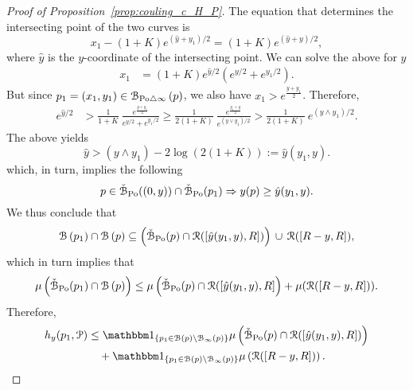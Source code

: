 \begin{proof}[Proof of Proposition~\ref{prop:couling_c_H_P}]
The equation that determines the intersecting point of the two curves is
\[
	x_1 - (1+K)e^{(\hat{y} + y_1)/2}= (1+K) e^{(\hat{y} + y)/2},
\]
where $\hat{y}$ is the $y$-coordinate of the intersecting point. 
We can solve the above for $\hat{y}$  
\begin{equation*} 
\begin{split}
x_1 &=(1+K) e^{\hat{y}/2} \left( e^{y/2} + e^{y_1/2} \right).
\end{split}
\end{equation*}
But since $p_1=(x_1,y_1)  \in {\mathcal B}_{{\mathrm{Po}} \bigtriangleup \infty}\left(p\right)$, we also have $x_1 > e^{\frac{y + y_1}{2}}$. Therefore, 
\begin{equation}\label{eq:bounds_fat_ball_points}
\begin{split}
 e^{\hat{y}/2}& > \frac{1}{1+K}~\frac{e^{\frac{y + y_1}{2}}}{ e^{y/2}+ e^{y_1/2}} \geq 
\frac{1}{2(1+K)}~\frac{e^{\frac{y_1 + y}{2}}}{ e^{(y \vee y_1) /2}} 
> \frac{1}{2(1 + K)} ~ e^{(y \wedge y_1)/2}. 
 \end{split}
\end{equation}
The above yields
\begin{equation} \label{eq:to_use_I}
\hat{y} > (y \wedge y_1) - 2\log(2(1+K)) := \hat{y}(y_1, y). 
\end{equation}
which, in turn, implies the following 
\begin{equation}\label{eq:intersex_approx}
	p \in \check{{\mathcal B}}_{{\mathrm{Po}}}((0,y))\cap \check{{\mathcal B}}_{{\mathrm{Po}}}(p_1) \Rightarrow y(p) \ge \hat{y}(y_1,y).
\end{equation}
We thus conclude that 
\[ 
	{\mathcal B}\left(p_1\right) \cap {\mathcal B}\left(p\right) \subseteq \left(\check{{\mathcal B}}_{{\mathrm{Po}}}(p) \cap {\mathcal R}([\hat{y}(y_1,y), R])\right)
	\, \cup \, {\mathcal R} ([R - y,R]),
\]
which in turn implies that
\[
	\mu \left( \check{{\mathcal B}}_{{\mathrm{Po}}}(p_1) \cap {\mathcal B}\left(p\right) \right) \leq 
	\mu\left( \check{{\mathcal B}}_{{\mathrm{Po}}}(p) \cap  {\mathcal R}([\hat{y}(y_1,y), R]\right) + 
	\mu ({\mathcal R} ([R - y, R]) ).
\]
Therefore, 
\begin{align*} 
	h_y(p_1, \Pcal) &\leq \ind{p_1 \in \BallHyp{p}\setminus \BallPo{p}} 
    	\mu  \left( \FatBallHyp{p} \cap  \Rcal([\hat{y}(y_1,y), R])\right)
        \\
	&\hspace{10pt}+ \ind{p_1 \in \BallHyp{p}\setminus \BallPo{p}}
    	\mu  \left( \Rcal ([R - y, R]) \right).
\end{align*}




\end{proof}

